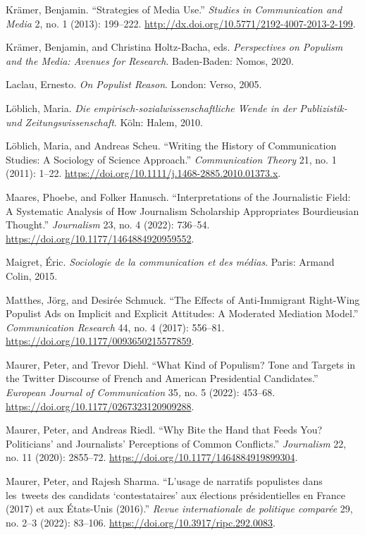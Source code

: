 \documentclass{tufte-handout}
\begin{document}
\begin{hangparas}{.25in}{1}
Krämer, Benjamin. ``Strategies of Media Use.'' \emph{Studies in
Communication and Media} 2, no. 1 (2013): 199--222.
\url{http://dx.doi.org/10.5771/2192-4007-2013-2-199}.

Krämer, Benjamin, and Christina Holtz-Bacha, eds. \emph{Perspectives on
Populism and the Media: Avenues for Research}. Baden-Baden: Nomos, 2020.

Laclau, Ernesto. \emph{On Populist Reason}. London: Verso, 2005.

Löblich, Maria. \emph{Die empirisch-sozialwissenschaftliche Wende in der
Publizistik- und Zeitungswissenschaft}. Köln: Halem, 2010.

Löblich, Maria, and Andreas Scheu. ``Writing the History of
Communication Studies: A Sociology of Science Approach.''
\emph{Communication Theory} 21, no. 1 (2011): 1--22.
\url{https://doi.org/10.1111/j.1468-2885.2010.01373.x}.

Maares, Phoebe, and Folker Hanusch. ``Interpretations of the
Journalistic Field: A Systematic Analysis of How Journalism Scholarship
Appropriates Bourdieusian Thought.'' \emph{Journalism} 23, no. 4 (2022):
736--54. \url{https://doi.org/10.1177/1464884920959552}.

Maigret, Éric. \emph{Sociologie de la communication et des médias}.
Paris: Armand Colin, 2015.

Matthes, Jörg, and Desirée Schmuck. ``The Effects of Anti-Immigrant
Right-Wing Populist Ads on Implicit and Explicit Attitudes: A Moderated
Mediation Model.'' \emph{Communication Research} 44, no. 4 (2017):
556--81. \url{https://doi.org/10.1177/0093650215577859}.

Maurer, Peter, and Trevor Diehl. ``What Kind of Populism? Tone and
Targets in the Twitter Discourse of French and American Presidential
Candidates.'' \emph{European Journal of Communication} 35\emph{,} no. 5
(2022): 453--68. \url{https://doi.org/10.1177/0267323120909288}.

Maurer, Peter, and Andreas Riedl. ``Why Bite the Hand that Feeds You?
Politicians' and Journalists' Perceptions of Common Conflicts.''
\emph{Journalism} 22, no. 11 (2020): 2855--72.
\url{https://doi.org/10.1177/1464884919899304}.

Maurer, Peter, and Rajesh Sharma. ``L'usage de narratifs populistes dans
les~tweets des candidats `contestataires' aux élections présidentielles
en France (2017) et aux États-Unis (2016).'' \emph{Revue internationale
de politique comparée} 29, no. 2--3 (2022): 83--106.
\url{https://doi.org/10.3917/ripc.292.0083}.


\end{hangparas}
\end{document}
